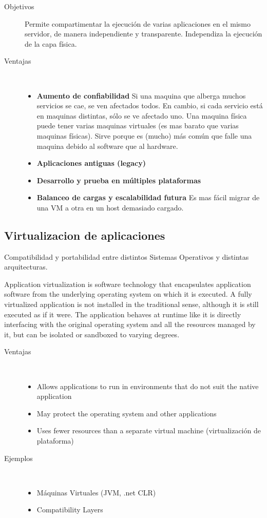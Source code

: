 \documentclass[a4paper, twoside]{article}
\begin{document}
\begin{description}
	\item[Objetivos] Permite compartimentar la ejecución de varias aplicaciones en el mismo servidor, de manera independiente y transparente. Independiza la ejecución de la capa física.

	\item[Ventajas] ~
	\begin{itemize}
		\item \textbf{Aumento de confiabilidad} Si una maquina que alberga muchos servicios se cae, se ven afectados todos. En cambio, si cada servicio está en maquinas distintas, sólo se ve afectado uno. Una maquina física puede tener varias maquinas virtuales (es mas barato que varias maquinas físicas). Sirve porque es (mucho) más común que falle una maquina debido al software que al hardware.
		\item \textbf{Aplicaciones antiguas (legacy)}
		\item \textbf{Desarrollo y prueba en múltiples plataformas}
		\item \textbf{Balanceo de cargas y escalabilidad futura} Es mas fácil migrar de una VM a otra en un host demasiado cargado.	
	\end{itemize}
\end{description}

\subsection{Virtualizacion de aplicaciones}
Compatibilidad y portabilidad entre distintos Sistemas Operativos y distintas arquitecturas.

Application virtualization is software technology that encapsulates application software from the underlying operating system on which it is executed. A fully virtualized application is not installed in the traditional sense, although it is still executed as if it were. The application behaves at runtime like it is directly interfacing with the original operating system and all the resources managed by it, but can be isolated or sandboxed to varying degrees.

\begin{description}
	\item[Ventajas] ~
	\begin{itemize}
		\item Allows applications to run in environments that do not suit the native application
		\item May protect the operating system and other applications
		\item Uses fewer resources than a separate virtual machine (virtualización de plataforma)
	\end{itemize}

	\item[Ejemplos] ~
	\begin{itemize}
		\item Máquinas Virtuales (JVM, .net CLR)
		\item Compatibility Layers
	\end{itemize}
\end{description}
\end{document}
